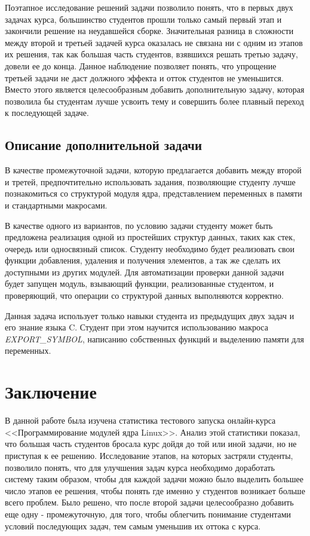 Поэтапное исследование решений задачи позволило понять, что в первых двух задачах курса, большинство студентов прошли только самый первый этап и закончили решение на неудавшейся сборке. Значительная разница в сложности между второй и третьей задачей курса оказалась не связана ни с одним из этапов их решения, так как большая часть студентов, взявшихся решать третью задачу, довели ее до конца. Данное наблюдение позволяет понять, что упрощение третьей задачи не даст должного эффекта и отток студентов не уменьшится. Вместо этого является целесообразным добавить дополнительную задачу, которая позволила бы студентам лучше усвоить тему и совершить более плавный переход к последующей задаче.

\subsection{Описание дополнительной задачи}
В качестве промежуточной задачи, которую предлагается добавить между второй и третей, предпочтительно использовать задания, позволяющие студенту лучше познакомиться со структурой модуля ядра, представлением переменных в памяти и стандартными макросами.

В качестве одного из вариантов, по условию задачи студенту может быть предложена реализация одной из простейших структур данных, таких как стек, очередь или односвязный список. Студенту необходимо будет реализовать свои функции добавления, удаления и получения элементов, а так же сделать их доступными из других модулей. Для автоматизации проверки данной задачи будет запущен модуль, взывающий функции, реализованные студентом, и проверяющий, что операции со структурой данных выполняются корректно.

Данная задача использует только навыки студента из предыдущих двух задач и его знание языка C. Студент при этом научится использованию макроса \textit{EXPORT\_SYMBOL}, написанию собственных функций и выделению памяти для переменных.

\section{Заключение}
В данной работе была изучена статистика тестового запуска онлайн-курса <<Программирование модулей ядра Linux>>. Анализ этой статистики показал, что большая часть студентов бросала курс дойдя до той или иной задачи, но не приступая к ее решению. Исследование этапов, на которых застряли студенты, позволило понять, что для улучшения задач курса необходимо доработать систему таким образом, чтобы для каждой задачи можно было выделить большее число этапов ее решения, чтобы понять где именно у студентов возникает больше всего проблем. Было решено, что после второй задачи целесообразно добавить еще одну - промежуточную, для того, чтобы облегчить понимание студентами условий последующих задач, тем самым уменьшив их оттока с курса.
